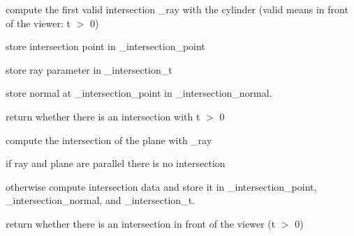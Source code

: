 
\begin{DoxyRefList}
\item[\label{todo__todo000001}%
\hypertarget{todo__todo000001}{}%
Member \hyperlink{classCylinder_a0ae732b1b669bbeb9eb83ee7395a5add}{Cylinder\+:\+:intersect} (const \hyperlink{classRay}{Ray} \&\+\_\+ray, \hyperlink{classvec3}{vec3} \&\+\_\+intersection\+\_\+point, \hyperlink{classvec3}{vec3} \&\+\_\+intersection\+\_\+normal, double \&\+\_\+intersection\+\_\+t) const override]
\begin{DoxyItemize}
\item compute the first valid intersection {\ttfamily \+\_\+ray} with the cylinder (valid means in front of the viewer\+: t $>$ 0)
\item store intersection point in {\ttfamily \+\_\+intersection\+\_\+point}
\item store ray parameter in {\ttfamily \+\_\+intersection\+\_\+t}
\item store normal at \+\_\+intersection\+\_\+point in {\ttfamily \+\_\+intersection\+\_\+normal}.
\item return whether there is an intersection with t $>$ 0  
\end{DoxyItemize}
\item[\label{todo__todo000002}%
\hypertarget{todo__todo000002}{}%
Member \hyperlink{classPlane_ab146bb10ad52e8535dad25d531c43b86}{Plane\+:\+:intersect} (const \hyperlink{classRay}{Ray} \&\+\_\+ray, \hyperlink{classvec3}{vec3} \&\+\_\+intersection\+\_\+point, \hyperlink{classvec3}{vec3} \&\+\_\+intersection\+\_\+normal, double \&\+\_\+intersection\+\_\+t) const override]
\begin{DoxyItemize}
\item compute the intersection of the plane with {\ttfamily \+\_\+ray}
\item if ray and plane are parallel there is no intersection
\item otherwise compute intersection data and store it in {\ttfamily \+\_\+intersection\+\_\+point}, {\ttfamily \+\_\+intersection\+\_\+normal}, and {\ttfamily \+\_\+intersection\+\_\+t}.
\item return whether there is an intersection in front of the viewer (t $>$ 0) 
\end{DoxyItemize}
\end{DoxyRefList}